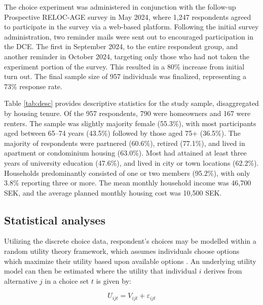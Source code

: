 \documentclass[3p,11pt ]{elsarticle}
\begin{document}
The choice experiment was administered in conjunction with the follow-up Prospective RELOC-AGE survey in May 2024,
where 1,247 respondents agreed to participate in the survey via a web-based platform.
Following the initial survey administration, 
two reminder mails were sent out to encouraged participation in the DCE.
The first in September 2024,
to the entire respondent group,
and another reminder in October 2024,
targeting only those who had not taken the experiment portion of the survey.
This resulted in a 80\% increase from initial turn out.
The final sample size of 957 individuals was finalized, representing a 73\% response rate.

Table \ref{tab:desc} provides descriptive statistics for the study sample, disaggregated by housing tenure.
Of the 957 respondents, 790 were homeowners and 167 were renters.
The sample was slightly majority female (55.3\%), with most participants aged between 65–74 years (43.5\%) followed by those aged 75+ (36.5\%).
The majority of respondents were partnered (60.6\%), retired (77.1\%), and lived in apartment or condominium housing (63.0\%).
Most had attained at least three years of university education (47.6\%), and lived in city or town locations (62.2\%).
Households predominantly consisted of one or two members (95.2\%), with only 3.8\% reporting three or more.
The mean monthly household income was 46,700 SEK, and the average planned monthly housing cost was 10,500 SEK.





\clearpage




\subsection{Statistical analyses}

Utilizing the discrete choice data,
respondent's choices may be modelled within a random utility theory framework,
which assumes individuals choose options which maximize their utility based upon available options \citep{lancsarConductingDiscreteChoice2008}.
An underlying utility model can then be estimated where the utility that individual \( i \) derives from alternative \( j \) in a choice set \( t \) is given by:

\begin{equation}
U_{ijt} = V_{ijt} + \varepsilon_{ijt}
\end{equation}
\end{document}
